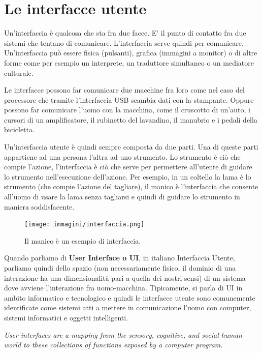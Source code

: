 \chapter{Le interfacce utente}

Un'interfaccia è qualcosa che sta fra due facce. E' il punto di contatto fra due sistemi che tentano di comunicare. L'interfaccia serve quindi per
comunicare. Un'interfaccia può essere fisica (pulsanti), grafica (immagini a monitor) o di altre forme come per esempio un interprete, un traduttore
simultaneo o un mediatore culturale. 

Le interfacce possono far comunicare due macchine fra loro come nel caso del processore che tramite l'interfaccia USB scambia dati con la stampante.
Oppure possono far comunicare l’uomo con la macchina, come il cruscotto di un’auto, i cursori di un amplificatore, il rubinetto del lavandino, il
manubrio e i pedali della bicicletta.

Un'interfaccia utente è quindi sempre composta da due parti. Una di queste parti appartiene ad una persona l'altra ad uno strumento. Lo strumento è
ciò che compie l'azione, l’interfaccia è ciò che serve per permettere all'utente di guidare lo strumento nell'esecuzione dell'azione. Per esempio,
in un coltello la lama è lo strumento (che compie l'azione del tagliare), il manico è l’interfaccia che consente all'uomo di usare la lama senza
tagliarsi e quindi di guidare lo strumento in maniera soddisfacente. 

\begin{figure}[!h]
	\centering
	\texttt{[image: immagini/interfaccia.png]}
	\caption{Il manico è un esempio di interfaccia.}
\end{figure}


Quando parliamo di \textbf{User Interface o UI}, in italiano Interfaccia Utente, parliamo quindi dello spazio (non necessariamente fisico, il dominio
di una interazione ha una dimensionalità pari a quella dei nostri sensi) di un sistema dove avviene l'interazione fra uomo-macchina. Tipicamente,
si parla di UI in ambito informatico e tecnologico e quindi le interfacce utente sono comunemente identificate come sistemi atti a mettere in
comunicazione l'uomo con computer, sistemi informatici e oggetti intelligenti.

\vspace{\baselineskip}
\textit{User interfaces are a mapping from the sensory, cognitive, and social human world to these collections of functions exposed by a computer
program.}

